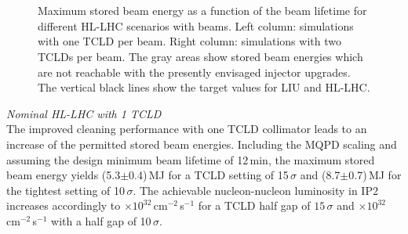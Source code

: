 \begin{figure}[htbp]
\begin{minipage}[b]{.49\linewidth}
\end{minipage}
%
\\ \mbox{} \\ 
%
\begin{minipage}[b]{.49\textwidth}
\end{minipage}%
\hfill
\begin{minipage}[b]{.49\linewidth}
\end{minipage}
\caption{Maximum stored beam energy as a function of the beam lifetime for different \mbox{HL-LHC} scenarios with \lead beams. Left column: simulations with one TCLD per beam. Right column: simulations with two TCLDs per beam. The gray areas show stored beam energies which are not reachable with the presently envisaged injector upgrades. The vertical black lines show the target values for LIU and HL-LHC. }
\label{fig:escompa}
\end{figure}

\vspace{0.2cm}

\textit{Nominal HL-LHC with 1 TCLD} \\ 
The improved cleaning performance with one TCLD collimator leads to an increase of the permitted stored beam energies. Including the MQPD scaling and assuming the design minimum beam lifetime of 12\,min, the maximum stored beam energy yields (5.3$\pm$0.4)\,MJ for a TCLD setting of 15\,$\sigma$ and (8.7$\pm$0.7)\,MJ for the tightest setting of 10\,$\sigma$. The achievable nucleon-nucleon luminosity in IP2 increases accordingly to $\times 10^{32}$\,cm$^{-2}$\,s$^{-1}$ for a TCLD half gap of $15\,\sigma$ and $\times 10^{32}$\,cm$^{-2}$\,s$^{-1}$ with a half gap of 10$\,\sigma$. 

